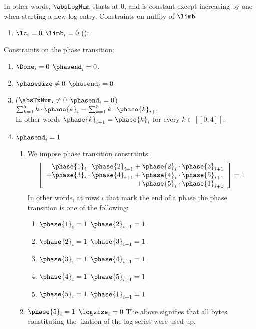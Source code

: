 In other words, $\absLogNum$ starts at 0, and is constant except increasing by one when starting a new log entry.
Constraints on nullity of $\limb$
\begin{enumerate}[resume]
    \item \If $\lc_{i}=0$ \Then $\limb_{i}=0$ (\trash);
\end{enumerate}
Constraints on the phase transition:
\begin{enumerate}[resume]
    \item \If $\Done_{i}=0$ \Then $\phasend_{i}=0$.
    \item \If $\phasesize \neq 0$ \Then $\phasend_{i}=0$
    \item \If ($\absTxNum_{i} \neq 0$ \et $\phasend_{i}=0$) \Then $\sum_{k=1}^{5} k \cdot \phase{k}_{i} = \sum_{k=1}^{5} k \cdot \phase{k}_{i+1}$                             \\
        In other words $\phase{k}_{i+1}=\phase{k}_{i}$ for every $k \in [\![ 0 ; 4 ]\!]$.
    \item \If $\phasend_{i}=1$ \Then
        \begin{enumerate}
            \item We impose phase transition constraints:
                \[
                    \left[
                        \begin{array}{r}
                            \phase{1}_{i} \cdot \phase{2}_{i+1}
                            + \phase{2}_{i} \cdot \phase{3}_{i+1} \\
                            + \phase{3}_{i} \cdot \phase{4}_{i+1} 
                            + \phase{4}_{i} \cdot \phase{5}_{i+1} \\
                            + \phase{5}_{i} \cdot \phase{1}_{i+1} \\
                        \end{array}
                        \right]
                    = 1
                \]
                In other words, at rows $i$ that mark the end of a phase the phase transition is one of the following:
                \begin{enumerate}
                    \item \If $\phase{1}_{i}=1$ \Then $\phase{2}_{i+1}=1$
                    \item \If $\phase{2}_{i}=1$ \Then $\phase{3}_{i+1}=1$
                    \item \If $\phase{3}_{i}=1$ \Then $\phase{4}_{i+1}=1$
                    \item \If $\phase{4}_{i}=1$ \Then $\phase{5}_{i+1}=1$
                    \item \If $\phase{5}_{i}=1$ \Then $\phase{1}_{i+1}=1$
                \end{enumerate}
            \item \If $\phase{5}_{i}=1$ \Then $\logsize_{i}=0$
                The above signifies that all bytes constituting the \rlp{}-ization of the log series were used up.
        \end{enumerate}
\end{enumerate}

